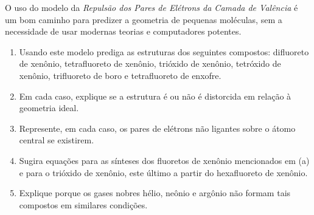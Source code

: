 O uso do modelo da \textit{Repulsão dos Pares de Elétrons da Camada de Valência} é um bom caminho para predizer a geometria de pequenas moléculas, sem a necessidade de usar modernas teorias e computadores potentes.

\begin{enumerate}[label = (\alph*)]
	\item Usando este modelo prediga as estruturas dos seguintes compostos: difluoreto de xenônio, tetrafluoreto de xenônio, trióxido de xenônio, tetróxido de xenônio, trifluoreto de boro e tetrafluoreto de enxofre.
	\item Em cada caso, explique se a estrutura é ou não é distorcida em relação à geometria ideal.
	\item Represente, em cada caso, os pares de elétrons não ligantes sobre o átomo central se existirem.
	\item Sugira equações para as sínteses dos fluoretos de xenônio mencionados em (a) e para o trióxido de xenônio, este último a partir do hexafluoreto de xenônio.
	\item Explique porque os gases nobres hélio, neônio e argônio não formam tais compostos em similares condições.
\end{enumerate}
